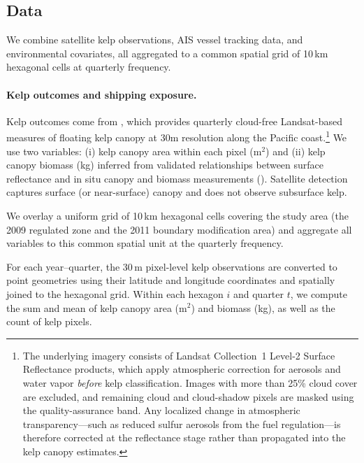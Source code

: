 \documentclass[12pt]{article}
\begin{document}
\subsection{Data}\label{sec:data}

We combine satellite kelp observations, AIS vessel tracking data, and environmental covariates, all aggregated to a common spatial grid of 10\,km hexagonal cells at quarterly frequency.

\paragraph{Kelp outcomes and shipping exposure.}
Kelp outcomes come from \citet{Bell2023}, which provides quarterly cloud-free Landsat-based measures of floating kelp canopy at 30m resolution along the Pacific coast.\footnote{The underlying imagery consists of Landsat Collection~1 Level-2 Surface Reflectance products, which apply atmospheric correction for aerosols and water vapor \emph{before} kelp classification. Images with more than 25\% cloud cover are excluded, and remaining cloud and cloud-shadow pixels are masked using the quality-assurance band. Any localized change in atmospheric transparency---such as reduced sulfur aerosols from the fuel regulation---is therefore corrected at the reflectance stage rather than propagated into the kelp canopy estimates.} We use two variables: (i) kelp canopy area within each pixel (m$^{2}$) and (ii) kelp canopy biomass (kg) inferred from validated relationships between surface reflectance and in situ canopy and biomass measurements (\citealp{Bell2023}). Satellite detection captures surface (or near-surface) canopy and does not observe subsurface kelp.

We overlay a uniform grid of 10\,km hexagonal cells covering the study area (the 2009 regulated zone and the 2011 boundary modification area) and aggregate all variables to this common spatial unit at the quarterly frequency.

For each year--quarter, the 30\,m pixel-level kelp observations are converted to point geometries using their latitude and longitude coordinates and spatially joined to the hexagonal grid. Within each hexagon $i$ and quarter $t$, we compute the sum and mean of kelp canopy area (m$^{2}$) and biomass (kg), as well as the count of kelp pixels.
\end{document}
